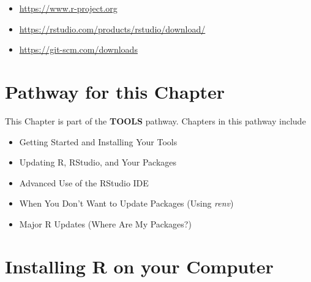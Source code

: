 \documentclass[
]{book}
\providecommand{\tightlist}{%
  \setlength{\itemsep}{0pt}\setlength{\parskip}{0pt}}
\begin{document}
\begin{itemize}
\tightlist
\item
  \url{https://www.r-project.org}
\item
  \url{https://rstudio.com/products/rstudio/download/}
\item
  \url{https://git-scm.com/downloads}
\end{itemize}

\hypertarget{pathway-for-this-chapter}{%
\section{Pathway for this Chapter}\label{pathway-for-this-chapter}}

This Chapter is part of the \textbf{TOOLS} pathway.
Chapters in this pathway include

\begin{itemize}
\tightlist
\item
  Getting Started and Installing Your Tools
\item
  Updating R, RStudio, and Your Packages
\item
  Advanced Use of the RStudio IDE
\item
  When You Don't Want to Update Packages (Using \emph{renv})
\item
  Major R Updates (Where Are My Packages?)
\end{itemize}

\hypertarget{installing-r-on-your-computer}{%
\section{Installing R on your Computer}\label{installing-r-on-your-computer}}
\end{document}
